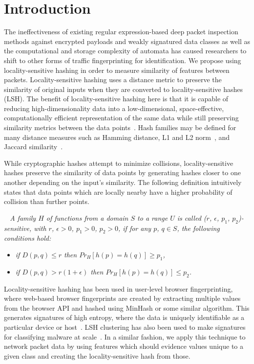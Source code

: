 \section{Introduction}
The ineffectiveness of existing regular expression-based deep packet inspection methods against encrypted payloads and weakly signatured data classes as well as the computational and storage complexity of automata has caused researchers to shift to other forms of traffic fingerprinting for identification. We propose using locality-sensitive hashing in order to measure similarity of features between packets. Locality-sensitive hashing uses a distance metric to preserve the similarity of original inputs when they are converted to locality-sensitive hashes (LSH). The benefit of locality-sensitive hashing here is that it is capable of reducing high-dimensionality data into a low-dimensional, space-effective, computationally efficient representation of the same data while still preserving similarity metrics between the data points~\cite{jafari2021survey}. Hash families may be defined for many distance measures such as Hamming distance, L1 and L2 norm~\cite{ANN-CoD}, and Jaccard similarity~\cite{minhash}.

While cryptographic hashes attempt to minimize collisions, locality-sensitive hashes preserve the similarity of data points by generating hashes closer to one another depending on the input's similarity. The following definition intuitively states that data points which are locally nearby have a higher probability of collision than further points.

\medskip

\begin{definition}
\textit{~\cite{lshforest} A family $H$ of functions from a domain $S$ to a range $U$ is called ($r$, $\epsilon$, $p_1$, $p_2$)-sensitive, with $r$, $\epsilon > 0$, $p_1 > 0$, $p_2 > 0$, if for any $p$, $q \in S$, the following conditions hold:}
\begin{itemize}
\item{\textit{if $D(p, q) \leq r$ then $Pr_H[h(p) = h(q)] \geq p_1$,}}
\item{\textit{if $D(p, q) > r(1 + \epsilon)$ then $Pr_H[h(p) = h(q)] \leq p_2$.}}
\end{itemize}
\end{definition}

\medskip

Locality-sensitive hashing has been used in user-level browser fingerprinting, where web-based browser fingerprints are created by extracting multiple values from the browser API and hashed using MinHash or some similar algorithm. This generates signatures of high entropy, where the data is uniquely identifiable as a particular device or host~\cite{browser}. LSH clustering has also been used to make signatures for classifying malware at scale~\cite{bayer}. In a similar fashion, we apply this technique to network packet data by using features which should evidence values unique to a given class and creating the locality-sensitive hash from those.

